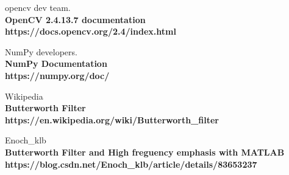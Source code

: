 \documentclass[11pt]{ctexart}
\begin{document}
\begin{thebibliography}{99}

 opencv dev team.\\
{\bf OpenCV 2.4.13.7 documentation\\}
{\bf https://docs.opencv.org/2.4/index.html\\}

  NumPy developers.\\
{\bf NumPy Documentation\\}
{\bf https://numpy.org/doc/\\}

  Wikipedia\\
{\bf Butterworth Filter\\}
{\bf https://en.wikipedia.org/wiki/Butterworth\_filter\\}

 Enoch\_klb\\
{\bf Butterworth Filter and High freguency emphasis with MATLAB\\}
{\bf https://blog.csdn.net/Enoch\_klb/article/details/83653237\\}


\end{thebibliography}
\end{document}
